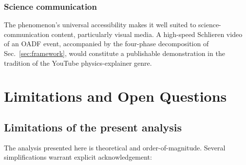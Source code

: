 \documentclass[11pt,a4paper]{article}
\theoremstyle{definition}
\theoremstyle{plain}
\begin{document}
\subsubsection{Science communication}
The phenomenon's universal accessibility makes it well suited to science-communication content, particularly visual media. A high-speed Schlieren video of an OADF event, accompanied by the four-phase decomposition of Sec.~\ref{sec:framework}, would constitute a publishable demonstration in the tradition of the YouTube physics-explainer genre.

\section{Limitations and Open Questions}
\label{sec:limits}

\subsection{Limitations of the present analysis}

The analysis presented here is theoretical and order-of-magnitude. Several simplifications warrant explicit acknowledgement:
\end{document}

